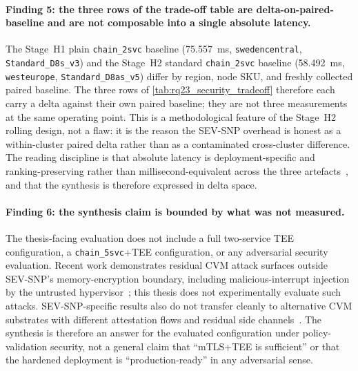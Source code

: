 \paragraph{Finding 5: the three rows of the trade-off table are
delta-on-paired-baseline and are not composable into a single absolute
latency.}
The Stage~H1 plain \texttt{chain\_2svc} baseline (75.557~ms,
\texttt{swedencentral}, \texttt{Standard\_D8s\_v3}) and the Stage~H2
standard \texttt{chain\_2svc} baseline (58.492~ms, \texttt{westeurope},
\texttt{Standard\_D8as\_v5}) differ by region, node SKU, and freshly
collected paired baseline. The three rows of
\cref{tab:rq23_security_tradeoff} therefore each carry a delta against
their own paired baseline; they are not three measurements at the same
operating point. This is a methodological feature of the Stage~H2 rolling
design, not a flaw: it is the reason the SEV-SNP overhead is honest as
a within-cluster paired delta rather than as a contaminated cross-cluster
difference. The reading discipline is that absolute latency is
deployment-specific and ranking-preserving rather than
millisecond-equivalent across the three
artefacts~\cite{benchmarking_sc15,noise_in_clouds}, and that the
synthesis is therefore expressed in delta space.

\paragraph{Finding 6: the synthesis claim is bounded by what was not
measured.}
The thesis-facing evaluation does not include a full two-service TEE
configuration, a \texttt{chain\_5svc}{}+{}TEE configuration, or any
adversarial security evaluation. Recent work demonstrates residual CVM
attack surfaces outside SEV-SNP's memory-encryption boundary, including
malicious-interrupt injection by the untrusted
hypervisor~\cite{schluter2024_heckler}; this thesis does not
experimentally evaluate such attacks. SEV-SNP-specific results also do
not transfer cleanly to alternative CVM substrates with different
attestation flows and residual side
channels~\cite{guanciale2022_confidential_quartet}. The synthesis is
therefore an answer for the evaluated configuration under
policy-validation security, not a general claim that ``mTLS+TEE is
sufficient'' or that the hardened deployment is ``production-ready'' in
any adversarial sense.

